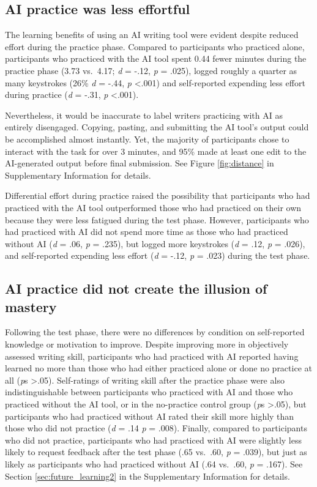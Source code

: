 \documentclass[11pt]{report}
\begin{document}
\begin{mainf}
\subsection{AI practice was less effortful}

The learning benefits of using an AI writing tool were evident
despite reduced effort during the practice phase. Compared to
participants who practiced alone, participants who practiced with the AI
tool spent 0.44 fewer minutes during the practice phase (3.73 vs.~4.17;
\emph{d} = -.12, \emph{p} = .025), logged roughly a quarter as many
keystrokes (26\% \emph{d} = -.44, \emph{p} \textless.001) and
self-reported expending less effort during practice (\emph{d} = -.31,
\emph{p} \textless.001).

Nevertheless, it would be inaccurate to label writers practicing with AI as entirely disengaged. 
  Copying, pasting, and submitting the AI tool's output could be accomplished almost instantly. 
  Yet, the majority of participants chose to interact with the task for over 3 minutes, and 95\% made at least one edit to the AI-generated output before final submission. See Figure \ref{fig:distance} in Supplementary Information for details.

Differential effort during practice raised the possibility that
participants who had practiced with the AI tool outperformed those who
had practiced on their own because they were less fatigued during the test
phase. However, participants who had practiced with AI did not spend more 
time as those who had practiced without AI (\emph{d} = .06, \emph{p} =
.235), but logged more keystrokes (\emph{d} = .12, \emph{p} = .026), and
self-reported expending less effort (\emph{d} = -.12, \emph{p} = .023)
during the test phase.

\subsection{AI practice did not create the illusion of mastery}
Following the test phase, there were no differences by condition on
self-reported knowledge or motivation to improve. Despite improving more in objectively assessed writing skill, participants who had practiced with
AI reported having learned no more than those who had either
practiced alone or done no practice at all (\textit{p}s
\textgreater .05). Self-ratings of writing skill after the practice
phase were also indistinguishable between participants who practiced
with AI and those who practiced without the AI tool, or in the
no-practice control group (\textit{p}s \textgreater .05), but
participants who had practiced without AI rated their skill more highly
than those who did not practice (\emph{d} = .14 \emph{p} = .008).
Finally, compared to participants who did not practice, participants who had
practiced with AI were slightly less likely to request feedback after
the test phase (.65 vs.~.60, \textit{p} = .039), but just as likely as
participants who had practiced without AI (.64 vs.~.60, \textit{p} = .167).
See Section \ref{sec:future_learning2} in the Supplementary Information
for details.


\end{mainf}
\end{document}
